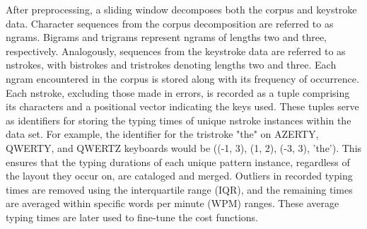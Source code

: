 \noindent After preprocessing, a sliding window decomposes both the corpus and keystroke data. Character sequences from the corpus decomposition are referred to as ngrams. Bigrams and trigrams represent ngrams of lengths two and three, respectively. Analogously, sequences from the keystroke data are referred to as nstrokes, with bistrokes and tristrokes denoting lengths two and three. Each ngram encountered in the corpus is stored along with its frequency of occurrence. Each nstroke, excluding those made in errors, is recorded as a tuple comprising its characters and a positional vector indicating the keys used. These tuples serve as identifiers for storing the typing times of unique nstroke instances within the data set. For example, the identifier for the tristroke "the" on AZERTY, QWERTY, and QWERTZ keyboards would be ((-1, 3), (1, 2), (-3, 3), 'the'). This ensures that the typing durations of each unique pattern instance, regardless of the layout they occur on, are cataloged and merged. Outliers in recorded typing times are removed using the interquartile range (IQR), and the remaining times are averaged within specific words per minute (WPM) ranges. These average typing times are later used to fine-tune the cost functions.





